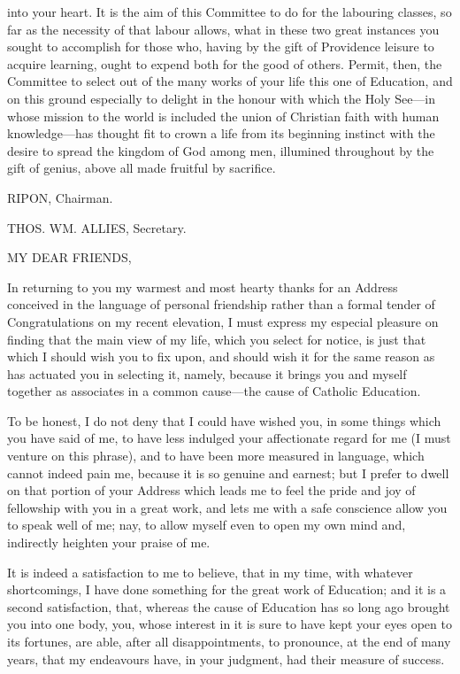 into your heart. It is the aim of this Committee to do for the
labouring classes, so far as the necessity of that labour allows, what
in these two great instances you sought to accomplish for those who,
having by the gift of Providence leisure to acquire learning, ought to
expend both for the good of others. Permit, then, the Committee to
select out of the many works of your life this one of Education, and
on this ground especially to delight in the honour with which the Holy
See—in whose mission to the world is included the union of Christian
faith with human knowledge—has thought fit to crown a life from its
beginning instinct with the desire to spread the kingdom of God among
men, illumined throughout by the gift of genius, above all made
fruitful by sacrifice.

RIPON, Chairman.

THOS. WM. ALLIES,
Secretary.


MY DEAR FRIENDS,

In returning to you my warmest and most hearty thanks for an Address
conceived in the language of personal friendship rather than a formal
tender of Congratulations on my recent elevation, I must express my
especial pleasure on finding that the main view of my life, which you
select for notice, is just that which I should wish you to fix upon,
and should wish it for the same reason as has actuated you in
selecting it, namely, because it brings you and myself together as
associates in a common cause—the cause of Catholic Education.

To be honest, I do not deny that I could have wished you, in some
things which you have said of me, to have less indulged your
affectionate regard for me (I must venture on this phrase), and to
have been more measured in language, which cannot indeed pain me,
because it is so genuine and earnest; but I prefer to dwell on that
portion of your Address which leads me to feel the pride and joy of
fellowship with you in a great work, and lets me with a safe
conscience allow you to speak well of me; nay, to allow myself even to
open my own mind and, indirectly heighten your praise of me.

It is indeed a satisfaction to me to believe, that in my time, with
whatever shortcomings, I have done something for the great work of
Education; and it is a second satisfaction, that, whereas the cause of
Education has so long ago brought you into one body, you, whose
interest in it is sure to have kept your eyes open to its fortunes,
are able, after all disappointments, to pronounce, at the end of many
years, that my endeavours have, in your judgment, had their measure of
success.

